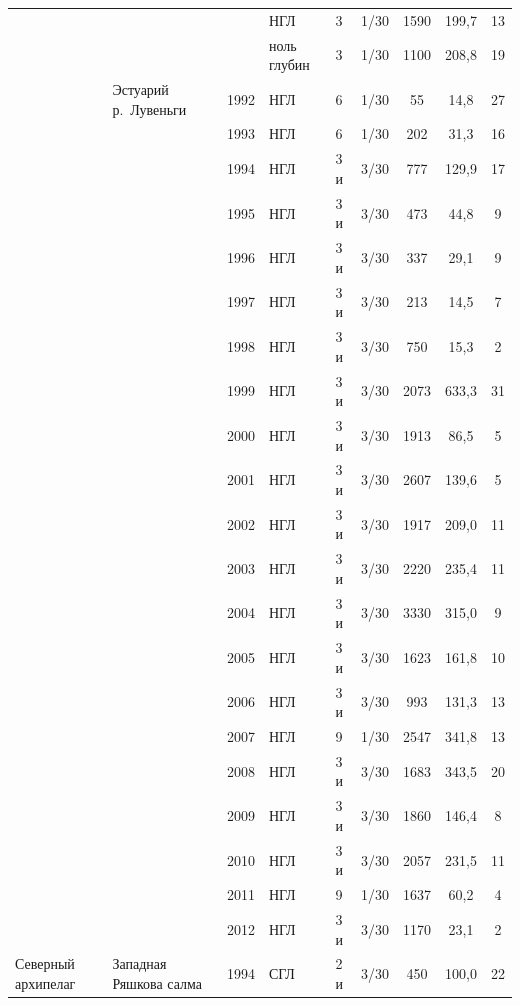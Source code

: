 \begin{footnotesize}
\begin{longtable}{|p{2cm}|p{3cm}|p{1cm}|p{2cm}|p{1.5cm}|p{1cm}|*{3}{c|}}
		\\ \cline{4-9}
		 &  &  & НГЛ & 3 & 1/30 & 1590 & 199,7 & 13
		\\ \cline{4-9}
		 &  &  & ноль глубин & 3 & 1/30 & 1100 & 208,8 & 19
		\\ \cline{2-9}
	 & Эстуарий р.~Лувень\-ги & 1992 & НГЛ & 6 & 1/30 & 55 & 14,8 & 27
		\\ \cline{3-9}
		 &  & 1993 & НГЛ & 6 & 1/30 & 202 & 31,3 & 16
		\\ \cline{3-9}
		 &  & 1994 & НГЛ & 3 и & 3/30 & 777 & 129,9 & 17
		\\ \cline{3-9}
		 &  & 1995 & НГЛ & 3 и & 3/30 & 473 & 44,8 & 9
		\\ \cline{3-9}
		 &  & 1996 & НГЛ & 3 и & 3/30 & 337 & 29,1 & 9
		\\ \cline{3-9}
		 &  & 1997 & НГЛ & 3 и & 3/30 & 213 & 14,5 & 7
		\\ \cline{3-9}
		 &  & 1998 & НГЛ & 3 и & 3/30 & 750 & 15,3 & 2
		\\ \cline{3-9}
		 &  & 1999 & НГЛ & 3 и & 3/30 & 2073 & 633,3 & 31
		\\ \cline{3-9}
		 &  & 2000 & НГЛ & 3 и & 3/30 & 1913 & 86,5 & 5
		\\ \cline{3-9}
		 &  & 2001 & НГЛ & 3 и & 3/30 & 2607 & 139,6 & 5
		\\ \cline{3-9}
		 &  & 2002 & НГЛ & 3 и & 3/30 & 1917 & 209,0 & 11
		\\ \cline{3-9}
		 &  & 2003 & НГЛ & 3 и & 3/30 & 2220 & 235,4 & 11
		\\ \cline{3-9}
		 &  & 2004 & НГЛ & 3 и & 3/30 & 3330 & 315,0 & 9
		\\ \cline{3-9}
		 &  & 2005 & НГЛ & 3 и & 3/30 & 1623 & 161,8 & 10
		\\ \cline{3-9}
		 &  & 2006 & НГЛ & 3 и & 3/30 & 993 & 131,3 & 13
		\\ \cline{3-9}
		 &  & 2007 & НГЛ & 9 & 1/30 & 2547 & 341,8 & 13
		\\ \cline{3-9}
		 &  & 2008 & НГЛ & 3 и & 3/30 & 1683 & 343,5 & 20
		\\ \cline{3-9}
		 &  & 2009 & НГЛ & 3 и & 3/30 & 1860 & 146,4 & 8
		\\ \cline{3-9}
		 &  & 2010 & НГЛ & 3 и & 3/30 & 2057 & 231,5 & 11
		\\ \cline{3-9}
		 &  & 2011 & НГЛ & 9 & 1/30 & 1637 & 60,2 & 4
		\\ \cline{3-9}
		 &  & 2012 & НГЛ & 3 и & 3/30 & 1170 & 23,1 & 2
		\\ \hline
	Северный архипелаг & Западная Ряшкова салма & 1994 & СГЛ & 2 и & 3/30 & 450 & 100,0 & 22

\end{longtable}
\end{footnotesize}
